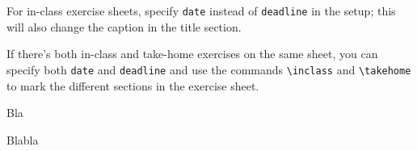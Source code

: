 \documentclass[english]{mhexsheet}
\begin{document}
\maketitle



For in-class exercise sheets, specify \verb|date| instead of \verb|deadline| in the setup; this will also change the caption in the title section.

If there's both in-class and take-home exercises on the same sheet, you can specify both \verb|date| and \verb|deadline| and use the commands \verb|\inclass| and \verb|\takehome| to mark the different sections in the exercise sheet.
\inclass

\begin{exercise}
Bla
\end{exercise}


\takehome
\begin{exercise}[title=Lemma of Zorn,points=100]
Blabla
\end{exercise}
\end{document}

